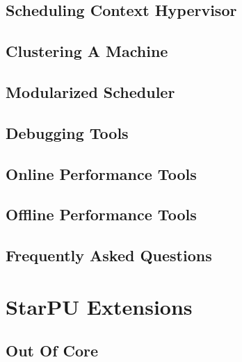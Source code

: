 \chapter{Scheduling Context Hypervisor}
\label{SchedulingContextHypervisor}
\hypertarget{SchedulingContextHypervisor}{}


\chapter{Clustering A Machine}
\label{ClusteringAMachine}
\hypertarget{ClusteringAMachine}{}


\chapter{Modularized Scheduler}
\label{ModularizedScheduler}
\hypertarget{ModularizedScheduler}{}


\chapter{Debugging Tools}
\label{DebuggingTools}
\hypertarget{DebuggingTools}{}


\chapter{Online Performance Tools}
\label{OnlinePerformanceTools}
\hypertarget{OnlinePerformanceTools}{}


\chapter{Offline Performance Tools}
\label{OfflinePerformanceTools}
\hypertarget{OfflinePerformanceTools}{}


\chapter{Frequently Asked Questions}
\label{FrequentlyAskedQuestions}
\hypertarget{FrequentlyAskedQuestions}{}


\part{StarPU Extensions}

\chapter{Out Of Core}
\label{OutOfCore}
\hypertarget{OutOfCore}{}


